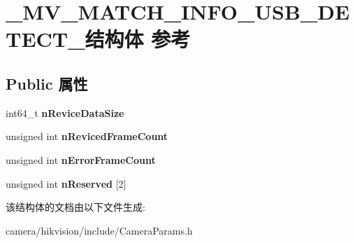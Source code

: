 \hypertarget{struct___m_v___m_a_t_c_h___i_n_f_o___u_s_b___d_e_t_e_c_t__}{}\section{\+\_\+\+M\+V\+\_\+\+M\+A\+T\+C\+H\+\_\+\+I\+N\+F\+O\+\_\+\+U\+S\+B\+\_\+\+D\+E\+T\+E\+C\+T\+\_\+结构体 参考}
\label{struct___m_v___m_a_t_c_h___i_n_f_o___u_s_b___d_e_t_e_c_t__}
\subsection*{Public 属性}
\begin{DoxyCompactItemize}
\item 
\mbox{\label{struct___m_v___m_a_t_c_h___i_n_f_o___u_s_b___d_e_t_e_c_t___a4b7f040f54677aedcde427bf6ce486e7}} 
int64\+\_\+t {\bfseries n\+Revice\+Data\+Size}
\item 
\mbox{\label{struct___m_v___m_a_t_c_h___i_n_f_o___u_s_b___d_e_t_e_c_t___af017fc1e198323e56e8fafe141927d64}} 
unsigned int {\bfseries n\+Reviced\+Frame\+Count}
\item 
\mbox{\label{struct___m_v___m_a_t_c_h___i_n_f_o___u_s_b___d_e_t_e_c_t___a97599aba7794c011337640dcc5f27cad}} 
unsigned int {\bfseries n\+Error\+Frame\+Count}
\item 
\mbox{\label{struct___m_v___m_a_t_c_h___i_n_f_o___u_s_b___d_e_t_e_c_t___afd680884d03009c6cfcc5c192e3c3a58}} 
unsigned int {\bfseries n\+Reserved} \mbox{[}2\mbox{]}
\end{DoxyCompactItemize}


该结构体的文档由以下文件生成\+:\begin{DoxyCompactItemize}
\item 
camera/hikvision/include/Camera\+Params.\+h\end{DoxyCompactItemize}
